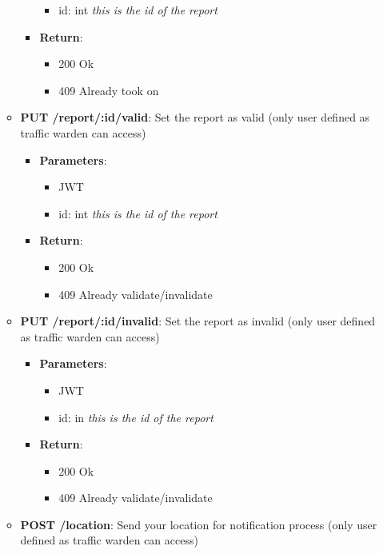 \documentclass{article}
\begin{document}
\begin{itemize}
\begin{itemize}
\begin{itemize}
\begin{itemize}
							\item id: int \textit{this is the id of the report}
						\end{itemize}
					\item \textbf{Return}:
						\begin{itemize}
							\item 200 Ok
							\item 409 Already took on
						\end{itemize}
				\end{itemize}
			\item \textbf{PUT /report/:id/valid}:
				Set the report as valid (only user defined as traffic warden can access)
				\begin{itemize}
					\item \textbf{Parameters}:
						\begin{itemize}
							\item JWT
							\item id: int \textit{this is the id of the report}
						\end{itemize}
					\item \textbf{Return}:
						\begin{itemize}
							\item 200 Ok
							\item 409 Already validate/invalidate
						\end{itemize}
				\end{itemize}
			\item \textbf{PUT /report/:id/invalid}:
				Set the report as invalid (only user defined as traffic warden can access)
				\begin{itemize}
					\item \textbf{Parameters}:
						\begin{itemize}
							\item JWT
							\item id: in \textit{this is the id of the report}
						\end{itemize}
					\item \textbf{Return}:
						\begin{itemize}
							\item 200 Ok
							\item 409 Already validate/invalidate
						\end{itemize}
				\end{itemize}
			\item \textbf{POST /location}:
				Send your location for notification process (only user defined as traffic warden can access)

\end{itemize}
\end{itemize}
\end{document}
